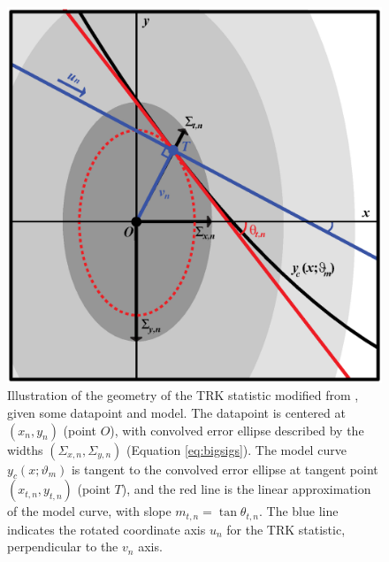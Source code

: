 \begin{figure}
    \centering
    \includegraphics[width=0.8\linewidth]{figures/datapoint_med_simp.eps}
    \caption{Illustration of the geometry of the TRK statistic modified from \textcite{trotter}, given some datapoint and model. The datapoint is centered at $(x_n,y_n)$ (point $O$), with convolved error ellipse described by the widths $(\Sigma_{x,n},\Sigma_{y,n})$ (Equation \eqref{eq:bigsigs}). The model curve $y_c(x;\vartheta_m)$ is tangent to the convolved error ellipse at tangent point $(x_{t,n},y_{t,n})$ (point $T$), and the red line is the linear approximation of the model curve, with slope $m_{t,n}=\tan\theta_{t,n}$. The blue line indicates the rotated coordinate axis $u_n$ for the TRK statistic, perpendicular to the $v_n$ axis.}
    \label{fig:datapointcolor}
\end{figure}